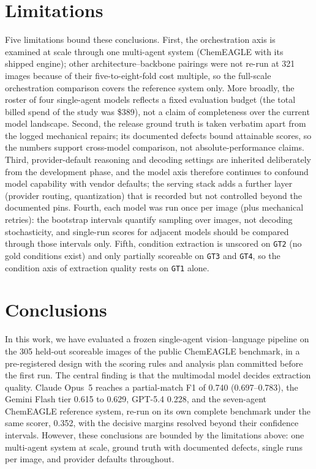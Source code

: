 \documentclass{article}
\begin{document}
\section{Limitations}
Five limitations bound these conclusions. First, the orchestration
axis is examined at scale through one multi-agent system (ChemEAGLE
with its shipped engine); other architecture--backbone pairings were
not re-run at 321 images because of their five-to-eight-fold cost
multiple, so the full-scale orchestration comparison covers the
reference system only. More broadly, the roster of four single-agent
models reflects a fixed evaluation budget (the total billed spend of
the study was \$389), not a claim of completeness over the current
model landscape. Second,
the release ground truth is taken verbatim apart from the logged
mechanical repairs; its documented defects bound attainable scores, so
the numbers support cross-model comparison, not absolute-performance
claims. Third, provider-default reasoning and decoding settings are
inherited deliberately from the development phase, and the model axis
therefore continues to confound model capability with vendor defaults;
the serving stack adds a further layer (provider routing,
quantization) that is recorded but not controlled beyond the
documented pins. Fourth, each model was run once per image (plus
mechanical retries): the bootstrap intervals quantify sampling over
images, not decoding stochasticity, and single-run scores for adjacent
models should be compared through those intervals only. Fifth,
condition extraction is unscored on \texttt{GT2} (no gold conditions
exist) and only partially scoreable on \texttt{GT3} and \texttt{GT4},
so the condition axis of extraction quality rests on \texttt{GT1}
alone.

\section{Conclusions}
In this work, we have evaluated a frozen single-agent vision--language
pipeline on the 305 held-out scoreable images of the public ChemEAGLE
benchmark, in a pre-registered design with the scoring rules and
analysis plan committed before the first run. The central finding is
that the multimodal model decides extraction quality. Claude Opus~5
reaches a partial-match F1 of 0.740 (0.697--0.783), the Gemini Flash
tier 0.615 to 0.629, GPT-5.4 0.228, and the seven-agent ChemEAGLE
reference system, re-run on its own complete benchmark under the same
scorer, 0.352, with the decisive margins resolved beyond their
confidence intervals. However, these conclusions are bounded by the
limitations above: one multi-agent system at scale, ground truth with
documented defects, single runs per image, and provider defaults
throughout.
\end{document}
